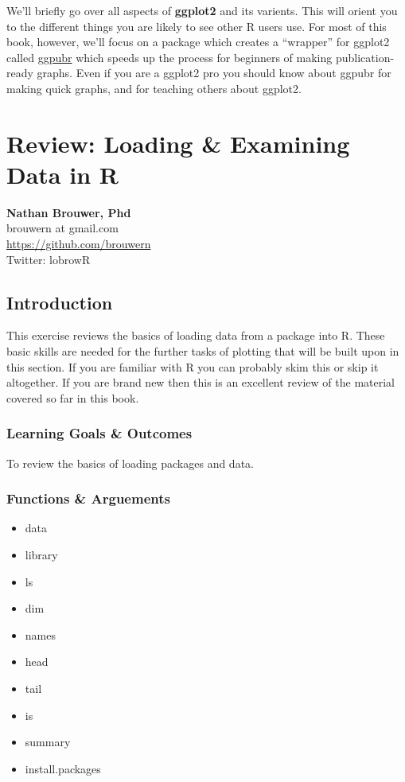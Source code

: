 \documentclass[]{book}
\providecommand{\tightlist}{%
  \setlength{\itemsep}{0pt}\setlength{\parskip}{0pt}}
\theoremstyle{definition}
\theoremstyle{definition}
\theoremstyle{definition}
\theoremstyle{remark}
\begin{document}
We'll briefly go over all aspects of \textbf{ggplot2} and its varients.
This will orient you to the different things you are likely to see other
R users use. For most of this book, however, we'll focus on a package
which creates a ``wrapper'' for ggplot2 called
\href{http://www.sthda.com/english/rpkgs/ggpubr/}{ggpubr} which speeds
up the process for beginners of making publication-ready graphs. Even if
you are a ggplot2 pro you should know about ggpubr for making quick
graphs, and for teaching others about ggplot2.

\chapter{Review: Loading \& Examining Data in
R}\label{review-loading-examining-data-in-r}

\textbf{Nathan Brouwer, Phd}\\
brouwern at gmail.com\\
\url{https://github.com/brouwern}\\
Twitter: lobrowR

\section{Introduction}\label{introduction-5}

This exercise reviews the basics of loading data from a package into R.
These basic skills are needed for the further tasks of plotting that
will be built upon in this section. If you are familiar with R you can
probably skim this or skip it altogether. If you are brand new then this
is an excellent review of the material covered so far in this book.

\subsection{Learning Goals \& Outcomes}\label{learning-goals-outcomes-1}

To review the basics of loading packages and data.

\subsection{Functions \& Arguements}\label{functions-arguements-3}

\begin{itemize}
\tightlist
\item
  data
\item
  library
\item
  ls
\item
  dim
\item
  names
\item
  head
\item
  tail
\item
  is
\item
  summary
\item
  install.packages
\end{itemize}
\end{document}
